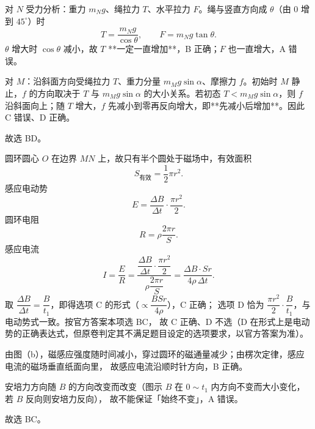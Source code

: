 \begin{answer}
对 $N$ 受力分析：重力 $m_{N}g$、绳拉力 $T$、水平拉力 $F$。绳与竖直方向成 $\theta$（由 $0$ 增到 $45^{\circ}$）时
\[
  T=\frac{m_{N}g}{\cos\theta},\qquad F=m_{N}g\tan\theta .
\]
$\theta$ 增大时 $\cos\theta$ 减小，故 $T$ **一定一直增加**，B 正确；$F$ 也一直增大，A 错误。

对 $M$：沿斜面方向受绳拉力 $T$、重力分量 $m_{M}g\sin\alpha$、摩擦力 $f$。初始时 $M$ 静止，$f$ 的方向取决于 $T$ 与 $m_{M}g\sin\alpha$ 的大小关系。若初态 $T<m_{M}g\sin\alpha$，则 $f$ 沿斜面向上；随 $T$ 增大，$f$ 先减小到零再反向增大，即**先减小后增加**。因此 C 错误、D 正确。

故选 BD。
\end{answer}

\begin{answer}
圆环圆心 $O$ 在边界 $MN$ 上，故只有半个圆处于磁场中，有效面积
\[
  S_{\text{有效}}=\frac{1}{2}\pi r^{2}.
\]
感应电动势
\[
  E=\frac{\Delta B}{\Delta t}\cdot\frac{\pi r^{2}}{2}.
\]
圆环电阻
\[
  R=\rho\frac{2\pi r}{S}.
\]
感应电流
\[
  I=\frac{E}{R}
   =\frac{\dfrac{\Delta B}{\Delta t}\cdot\dfrac{\pi r^{2}}{2}}{\rho\dfrac{2\pi r}{S}}
   =\frac{\Delta B\cdot Sr}{4\rho\,\Delta t}.
\]
取 $\dfrac{\Delta B}{\Delta t}=\dfrac{B}{t_{1}}$，即得选项 C 的形式（$\propto\dfrac{BSr}{4\rho}$），C 正确；
选项 D 恰为 $\dfrac{\pi r^{2}}{2}\cdot\dfrac{B}{t_{1}}$，与电动势式一致。按官方答案本项选 BC，
故 C 正确、D 不选（D 在形式上是电动势的正确表达式，但原卷判定其不满足题目设定的选项要求，以官方答案为准）。

由图（b），磁感应强度随时间减小，穿过圆环的磁通量减少；由楞次定律，感应电流的磁场垂直纸面向里，
故感应电流沿顺时针方向，B 正确。

安培力方向随 $B$ 的方向改变而改变（图示 $B$ 在 $0\sim t_{1}$ 内方向不变而大小变化，若 $B$ 反向则安培力反向），
故不能保证「始终不变」，A 错误。

故选 BC。
\end{answer}

